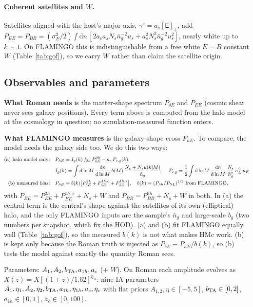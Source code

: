 \documentclass[11pt]{article}
\newcommand{\PNL}{P_{\rm NL}}
\newcommand{\bTA}{b_{\rm TA}}
\newcommand{\dd}{\mathrm{d}}
\begin{document}
\paragraph{Coherent satellites and $W$.} Satellites aligned with the host's
major axis, $\gamma^s = a_s[\mathsf E]_\perp$, add
$P_{EE} = P_{BB} = (\sigma_E^2/2)\!\int\!\dd n\,[2a_ca_sN_s\bar n_g^{-2}u_s + a_s^2N_s^2\bar n_g^{-2}u_s^2]$,
nearly white up to $k \sim 1$. On FLAMINGO this is indistinguishable from a free
white $E = B$ constant $W$ (Table~\ref{tab:gof}), so we carry $W$ rather than claim
the satellite origin.

\subsection{Observables and parameters}
\textbf{What Roman needs} is the matter-shape spectrum $P_{\delta E}$ and $P_{EE}$
(cosmic shear never sees galaxy positions). Every term above is computed from the
halo model at the cosmology in question; no simulation-measured function enters.

\textbf{What FLAMINGO measures} is the galaxy-shape cross $P_{hE}$. To compare,
the model needs the galaxy side too. We do this two ways:
\begin{align}
\text{(a) halo model only:}\quad & P_{hE} = I_g(k)\,f_{2h}\,P^{2h}_{\delta E} - a_c\,P_{c,g}(k),\label{eq:nob}\\
& I_g(k) = \int\dd\ln M\,\frac{\dd n}{\dd\ln M}\,b(M)\,\frac{N_c + N_s u(k|M)}{\bar n_g},\quad
P_{c,g} = \frac12\int\dd\ln M\,\frac{\dd n}{\dd\ln M}\,\frac{N_s}{\bar n_g^2}\,\sigma_E^2\,u_E\nonumber\\
\text{(b) measured bias:}\quad & P_{hE} = b(k)\big[P^{2h}_{\delta E} + P^{1h,c}_{\delta E} + P^{1h,s}_{\delta E}\big],
\quad b(k) = (P_{hh}/\PNL)^{1/2}\ \text{from FLAMINGO},
\end{align}
with $P_{EE} = P^{2h}_{EE} + P^{1h,s}_{EE} + N_s + W$ and $P_{BB} = P^{2h}_{BB} + N_s + W$
in both. In (a) the central term is the central's shape against the satellites
of its own (elliptical) halo, and the only FLAMINGO inputs are the sample's
$\bar n_g$ and large-scale $b_g$ (two numbers per snapshot, which fix the HOD).
(a) and (b) fit FLAMINGO equally well (Table~\ref{tab:gof}), so the measured
$b(k)$ is not what makes HMc work. (b) is kept only because the Roman truth is
injected as $P_{\delta E} \equiv P_{hE}/b(k)$, so (b) tests the model against
exactly the quantity Roman sees.

Parameters: $A_1, A_2, \bTA, a_{1h}, a_c$
(+ $W$). On Roman each amplitude evolves as $X(z) = X[(1+z)/1.62]^{\eta_X}$:
nine IA parameters $A_1, \eta_1, A_2, \eta_2, \bTA, a_{1h}, \eta_{1h}, a_c, \eta_c$
with flat priors $A_{1,2}, \eta \in [-5, 5]$, $\bTA \in [0, 2]$, $a_{1h} \in [0, 1]$,
$a_c \in [0, 100]$.
\end{document}
